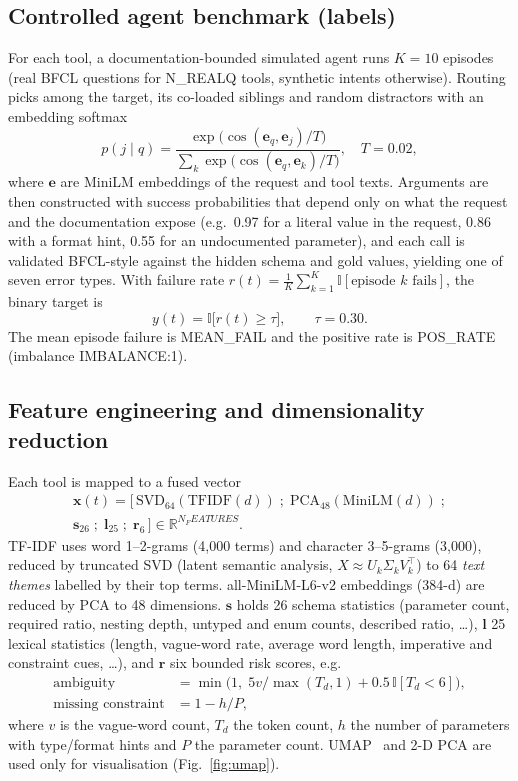 \documentclass[conference]{IEEEtran}
\begin{document}
\subsection{Controlled agent benchmark (labels)}
For each tool, a documentation-bounded simulated agent runs $K=10$ episodes (real BFCL questions for {{N_REALQ}} tools, synthetic intents otherwise). Routing picks among the target, its co-loaded siblings and random distractors with an embedding softmax
\begin{equation}
p(j\mid q)=\frac{\exp\big(\cos(\mathbf{e}_q,\mathbf{e}_j)/T\big)}{\sum_{k}\exp\big(\cos(\mathbf{e}_q,\mathbf{e}_k)/T\big)},\quad T=0.02,
\end{equation}
where $\mathbf{e}$ are MiniLM embeddings of the request and tool texts. Arguments are then constructed with success probabilities that depend only on what the request and the documentation expose (e.g.\ 0.97 for a literal value in the request, 0.86 with a format hint, 0.55 for an undocumented parameter), and each call is validated BFCL-style against the hidden schema and gold values, yielding one of seven error types. With failure rate $r(t)=\frac1K\sum_{k=1}^{K}\mathbb{I}[\text{episode }k\text{ fails}]$, the binary target is
\begin{equation}
y(t)=\mathbb{I}\big[r(t)\ge\tau\big],\qquad \tau=0.30 .
\end{equation}
The mean episode failure is {{MEAN_FAIL}} and the positive rate is {{POS_RATE}} (imbalance {{IMBALANCE}}:1).

\subsection{Feature engineering and dimensionality reduction}
Each tool is mapped to a fused vector
\begin{multline}
\mathbf{x}(t)=\big[\,\mathrm{SVD}_{64}(\mathrm{TFIDF}(d))\;;\;\mathrm{PCA}_{48}(\mathrm{MiniLM}(d))\;;\\
\mathbf{s}_{26}\;;\;\mathbf{l}_{25}\;;\;\mathbf{r}_{6}\,\big]\in\mathbb{R}^{{{N_FEATURES}}}.
\end{multline}
TF-IDF uses word 1--2-grams (4{,}000 terms) and character 3--5-grams (3{,}000), reduced by truncated SVD (latent semantic analysis, $X\approx U_k\Sigma_kV_k^{\top}$) to 64 \emph{text themes} labelled by their top terms. all-MiniLM-L6-v2 embeddings (384-d) are reduced by PCA to 48 dimensions. $\mathbf{s}$ holds 26 schema statistics (parameter count, required ratio, nesting depth, untyped and enum counts, described ratio, \ldots), $\mathbf{l}$ 25 lexical statistics (length, vague-word rate, average word length, imperative and constraint cues, \ldots), and $\mathbf{r}$ six bounded risk scores, e.g.
\begin{align}
\text{ambiguity}&=\min\!\big(1,\;5v/\max(T_d,1)+0.5\,\mathbb{I}[T_d<6]\big),\\
\text{missing constraint}&=1-h/P,
\end{align}
where $v$ is the vague-word count, $T_d$ the token count, $h$ the number of parameters with type/format hints and $P$ the parameter count. UMAP~\cite{umap} and 2-D PCA are used only for visualisation (Fig.~\ref{fig:umap}).
\end{document}
